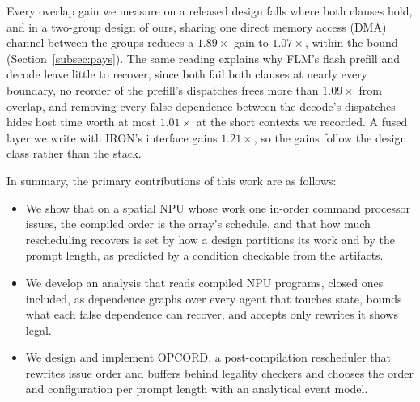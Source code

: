 Every overlap gain we measure on a released design falls where both clauses hold, and in a two-group design of ours, sharing one direct memory access (DMA) channel between the groups reduces a $1.89\times$ gain to $1.07\times$, within the bound (Section~\ref{subsec:pays}).
The same reading explains why FLM's flash prefill and decode leave little to recover, since both fail both clauses at nearly every boundary, no reorder of the prefill's dispatches frees more than $1.09\times$ from overlap, and removing every false dependence between the decode's dispatches hides host time worth at most $1.01\times$ at the short contexts we recorded.
A fused layer we write with IRON's interface gains $1.21\times$, so the gains follow the design class rather than the stack.

In summary, the primary contributions of this work are as follows:
\begin{itemize}
    \item We show that on a spatial NPU whose work one in-order command processor issues, the compiled order is the array's schedule, and that how much rescheduling recovers is set by how a design partitions its work and by the prompt length, as predicted by a condition checkable from the artifacts.
    \item We develop an analysis that reads compiled NPU programs, closed ones included, as dependence graphs over every agent that touches state, bounds what each false dependence can recover, and accepts only rewrites it shows legal.
    \item We design and implement OPCORD, a post-compilation rescheduler that rewrites issue order and buffers behind legality checkers and chooses the order and configuration per prompt length with an analytical event model.
\end{itemize}
